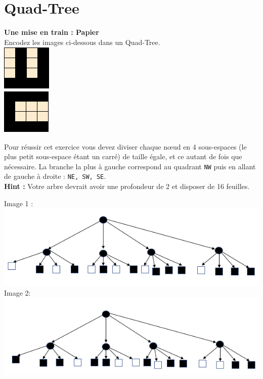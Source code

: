 \newpage

\section{ Quad-Tree}
\begin{Exercice}[10 minutes]\textbf{Une mise en train : Papier}\\

Encodez les images ci-dessous dans un Quad-Tree.\\

\includegraphics[]{Ressources/Quad-Tree 1.PNG}\\
\includegraphics[]{Ressources/Quad-Tree 2.PNG}

\begin{conseil}
   Pour réussir cet exercice vous devez diviser chaque nœud en 4 sous-espaces (le plus petit sous-espace étant un carré) de taille égale, et ce autant de fois que nécessaire. La branche la plus à gauche correspond au quadrant \lstinline{NW} puis en allant de gauche à droite : \lstinline{NE, SW, SE}. \\
    
    \textbf{Hint :} Votre arbre devrait avoir une profondeur de 2 et disposer de 16 feuilles.
\end{conseil}
\begin{solution}
Image 1 :\\
    \includegraphics[scale=0.65]{Solutions/Quad-Tree 1 solution.PNG}\\
    
Image 2: \\
    \includegraphics[scale=0.65]{Solutions/Quad-Tree 2 solution.PNG}
\end{solution}
\end{Exercice}
